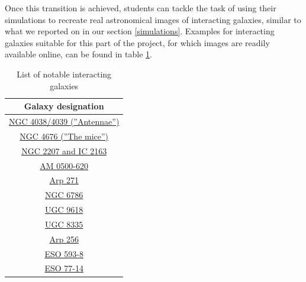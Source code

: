 \documentclass[11pt,twocolumn]{article}
\begin{document}
  
Once this transition is achieved, students can tackle the task of using their simulations to recreate real astronomical images of interacting galaxies, similar to what we reported on in our section \ref{simulations}. Examples for interacting galaxies suitable for this part of the project, for which images are readily available online, can be found in table \ref{InteractingGalaxies}.
\begin{table}[htp]
\begin{center}
\bgroup
\renewcommand{\arraystretch}{1.2}
\begin{tabular}{|c|}
\hline
Galaxy designation\\\hline\hline
\href{https://www.spacetelescope.org/images/heic0812c/}{NGC 4038/4039 (''Antennae'')}\\\hline
\href{https://www.spacetelescope.org/images/heic0206h/}{NGC 4676 (''The mice'')}\\\hline
\href{http://hubblesite.org/image/1627/news_release/2004-45}{NGC 2207 and IC 2163}\\\hline
\href{https://www.spacetelescope.org/images/heic0810bv/}{AM 0500-620}\\\hline
\href{https://apod.nasa.gov/apod/ap130825.html}{Arp 271}\\\hline
\href{https://www.spacetelescope.org/images/heic0810am/}{NGC 6786}\\\hline
\href{https://www.spacetelescope.org/images/heic0810af/}{UGC 9618}\\\hline
\href{https://www.spacetelescope.org/images/heic0810al/}{UGC 8335}\\\hline
\href{https://www.spacetelescope.org/images/heic0810ag/}{Arp 256}\\\hline
\href{https://www.spacetelescope.org/images/heic0810aj/}{ESO 593-8}\\\hline
\href{https://www.spacetelescope.org/images/heic0810ao/}{ESO 77-14}\\\hline
\end{tabular}
\egroup
\end{center}
\caption{List of notable interacting galaxies}
\label{InteractingGalaxies}
\end{table}%
\end{document}
